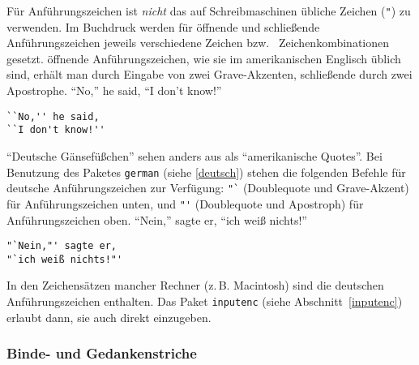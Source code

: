 Für Anführungszeichen ist \emph{nicht} das auf Schreibmaschinen
übliche Zeichen (\verb|"|) zu verwenden.
Im Buchdruck werden für öffnende und schließende
Anführungszeichen jeweils verschiedene Zeichen bzw.\ %
Zeichenkombinationen gesetzt.
öffnende Anführungszeichen, wie sie im amerikanischen Englisch 
üblich sind, erhält man durch Eingabe von zwei Grave-Akzenten, 
schließende durch zwei Apostrophe.
\exa
``No,'' he said,
``I don't know!''
\exb
\begin{verbatim}
``No,'' he said,
``I don't know!''
\end{verbatim}
\exc
"`Deutsche Gänsefüßchen"' sehen anders aus als ``amerikanische
Quotes''.  
Bei Benutzung des Paketes \texttt{german} (siehe \ref{deutsch})
stehen die folgenden Befehle für 
deutsche Anführungszeichen zur Verfügung:
\verb|"`| (Doublequote und Grave-Akzent) für Anführungszeichen
unten,
und
\verb|"'| (Doublequote und Apostroph) für Anführungszeichen oben.
\exa
"`Nein,"' sagte er,
"`ich weiß nichts!"'
\exb
\begin{verbatim}
"`Nein,"' sagte er,
"`ich weiß nichts!"'
\end{verbatim}
\exc
In den Zeichensätzen mancher Rechner (z.\,B. Macintosh) sind die deutschen 
Anführungszeichen enthalten.  Das Paket \texttt{inputenc} (siehe
Abschnitt~\ref{inputenc}) erlaubt dann, sie auch direkt einzugeben.


\subsubsection{Binde- und Gedankenstriche}
 
